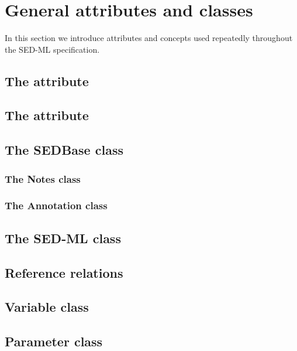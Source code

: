 \section{General attributes and classes}
In this section we introduce attributes and concepts used repeatedly throughout the SED-ML specification. 

\subsection{The   attribute}


\subsection{The  attribute}

\newpage
\subsection{The SEDBase class}


\subsubsection{The Notes class}


\subsubsection{The Annotation class}


\newpage
\subsection{The SED-ML class}


\newpage
\subsection{Reference relations}


\newpage
\subsection{Variable class}


\newpage
\subsection{Parameter class}


